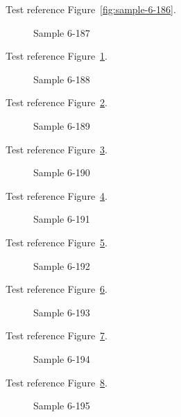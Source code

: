 Test reference Figure~\ref{fig:sample-6-186}.

\begin{figure}[tbhp]
\caption{Sample 6-187}
\label{fig:sample-6-187}
\end{figure}

Test reference Figure~\ref{fig:sample-6-187}.

\begin{figure}[tbhp]
\caption{Sample 6-188}
\label{fig:sample-6-188}
\end{figure}

Test reference Figure~\ref{fig:sample-6-188}.

\begin{figure}[tbhp]
\caption{Sample 6-189}
\label{fig:sample-6-189}
\end{figure}

Test reference Figure~\ref{fig:sample-6-189}.

\begin{figure}[tbhp]
\caption{Sample 6-190}
\label{fig:sample-6-190}
\end{figure}

Test reference Figure~\ref{fig:sample-6-190}.

\begin{figure}[tbhp]
\caption{Sample 6-191}
\label{fig:sample-6-191}
\end{figure}

Test reference Figure~\ref{fig:sample-6-191}.

\begin{figure}[tbhp]
\caption{Sample 6-192}
\label{fig:sample-6-192}
\end{figure}

Test reference Figure~\ref{fig:sample-6-192}.

\begin{figure}[tbhp]
\caption{Sample 6-193}
\label{fig:sample-6-193}
\end{figure}

Test reference Figure~\ref{fig:sample-6-193}.

\begin{figure}[tbhp]
\caption{Sample 6-194}
\label{fig:sample-6-194}
\end{figure}

Test reference Figure~\ref{fig:sample-6-194}.

\begin{figure}[tbhp]
\caption{Sample 6-195}
\label{fig:sample-6-195}
\end{figure}

